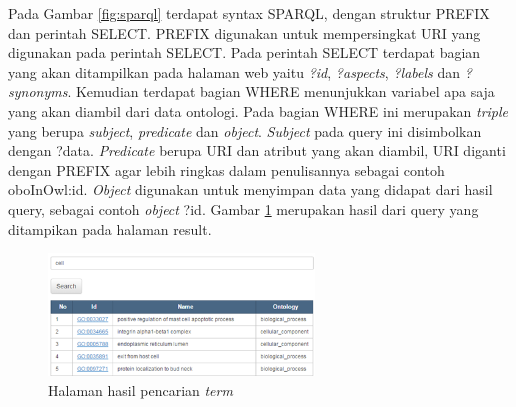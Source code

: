 Pada Gambar \ref{fig:sparql} terdapat syntax SPARQL, dengan struktur PREFIX dan perintah SELECT. PREFIX digunakan untuk mempersingkat URI yang digunakan pada perintah SELECT. Pada perintah SELECT terdapat bagian yang akan ditampilkan pada halaman web yaitu \textit{?id}, \textit{?aspects}, \textit{?labels} dan \textit{?synonyms}. Kemudian terdapat bagian WHERE menunjukkan variabel apa saja yang akan diambil dari data ontologi. Pada bagian WHERE ini merupakan \textit{triple} yang berupa \textit{subject}, \textit{predicate} dan \textit{object}. \textit{Subject} pada query ini disimbolkan dengan ?data. \textit{Predicate} berupa URI dan atribut yang akan diambil, URI diganti dengan PREFIX agar lebih ringkas dalam penulisannya sebagai contoh oboInOwl:id. \textit{Object} digunakan untuk menyimpan data yang didapat dari hasil query, sebagai contoh \textit{object} ?id. Gambar \ref{fig:result} merupakan hasil dari query yang ditampikan pada halaman result.

\begin{figure}[h!] %
	\centering
	\includegraphics[width=200pt]{result.png}
	\caption{Halaman hasil pencarian \textit{term}}
	\label{fig:result}
\end{figure}
